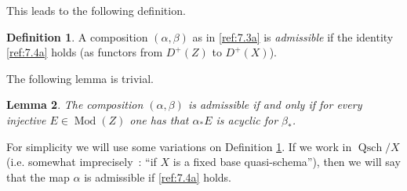 \documentclass{amsproc}
\def\Qsch{\operatorname {Qsch}}
\def\Qch{\operatorname {Mod}}
\newtheorem{lemmas}{Lemma}[subsection]
\theoremstyle{definition}
\newtheorem{definitions}[lemmas]{Definition}
\theoremstyle{remark}
\numberwithin{equation}{section}
\numberwithin{table}{section}
\numberwithin{figure}{section}
\begin{document}
This leads to the following definition.
\begin{definitions}
\label{ref:7.2.1a}
  A composition $(\alpha,\beta)$ as in \eqref{ref:7.3a} is
  \emph{admissible} if the identity \eqref{ref:7.4a} holds (as functors
  from $D^+(Z)$ to $D^+(X)$).
\end{definitions}
The following lemma is trivial.
\begin{lemmas}
\label{ref:7.2.2a}
The composition $(\alpha,\beta)$ is admissible if and only if for
every injective $E\in\Qch(Z)$ one has that $\alpha_\ast E$ is acyclic
for $\beta_\ast$.
\end{lemmas}
For simplicity we will use some variations on Definition
\ref{ref:7.2.1a}. If we work in $\Qsch/X$ (i.e. somewhat imprecisely~: ``if
$X$ is a fixed base quasi-schema''), then we will say that the map $\alpha$
is admissible if \eqref{ref:7.4a} holds.
\end{document}
